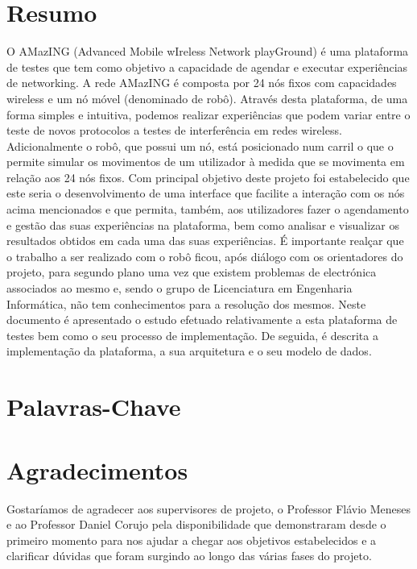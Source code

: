 \chapter{Resumo}
O AMazING  (Advanced Mobile wIreless Network playGround) é uma plataforma de testes que tem como objetivo a capacidade de agendar e executar experiências de networking. A rede AMazING é composta por 24 nós fixos com capacidades wireless e um nó móvel (denominado de robô).\newline
Através desta plataforma, de uma forma simples e intuitiva, podemos realizar experiências que podem variar entre o teste de novos protocolos a testes de interferência em redes wireless. Adicionalmente o robô, que possui um nó, está posicionado num carril o que o permite simular os movimentos de um utilizador à medida que se  movimenta em relação aos 24 nós fixos.\newline
Com principal objetivo deste projeto foi estabelecido que este seria o desenvolvimento de uma interface que facilite a interação com os nós acima mencionados e que permita, também, aos utilizadores fazer o agendamento e gestão das suas experiências na plataforma, bem como analisar e visualizar os resultados obtidos em cada uma das suas experiências. É importante realçar que o trabalho a ser realizado com o robô ficou, após diálogo com os orientadores do projeto, para segundo plano uma vez que existem problemas de electrónica associados ao mesmo e, sendo o grupo de Licenciatura em Engenharia Informática, não tem conhecimentos para a resolução dos mesmos.\newline
Neste documento é apresentado o estudo efetuado relativamente a esta plataforma de testes bem como o seu processo de implementação. De seguida, é descrita a implementação da plataforma, a sua arquitetura e o seu modelo de dados.
\chapter{Palavras-Chave}
\begin{acronym}[Keys]
\end{acronym}
\chapter{Agradecimentos}
Gostaríamos de agradecer aos supervisores de projeto, o Professor Flávio Meneses e ao Professor Daniel Corujo pela disponibilidade que demonstraram desde o primeiro momento para nos  ajudar a chegar aos objetivos estabelecidos e a clarificar dúvidas que foram surgindo ao longo das várias fases do projeto.
